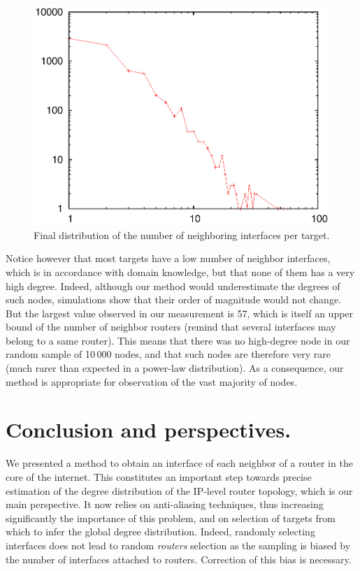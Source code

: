 \documentclass[conference]{IEEEtran}
\begin{document}
\begin{figure}[!ht]
\centering
\includegraphics[scale=.5]{constant-length.distrib.eps}
\caption{
Final distribution of the number of neighboring interfaces per target.
}
\label{fig-degrees}
\end{figure}

Notice however that most targets have a low number of neighbor interfaces, which is in accordance with domain knowledge, but that none of them has a very high degree. Indeed, although our method would underestimate the degrees of such nodes, simulations show that their order of magnitude would not change. But the largest value observed in our measurement is 57, which is itself an upper bound of the number of neighbor routers (remind that several interfaces may belong to a same router). This means that there was no high-degree node in our random sample of 10\,000 nodes, and that such nodes are therefore very rare (much rarer than expected in a power-law distribution). As a consequence, our method is appropriate for observation of the vast majority of nodes.

\section{Conclusion and perspectives.}\label{sec-result}\label{sec-discussion}

We presented a method to obtain an interface of each neighbor of a router in the core of the internet. This constitutes an important step towards precise estimation of the degree distribution of the IP-level router topology, which is our main perspective. It now relies on anti-aliasing techniques, thus increasing significantly the importance of this problem, and on selection of targets from which to infer the global degree distribution. Indeed, randomly selecting interfaces does not lead to random {\em routers} selection as the sampling is biased by the number of interfaces attached to routers. Correction of this bias is necessary.
\end{document}
